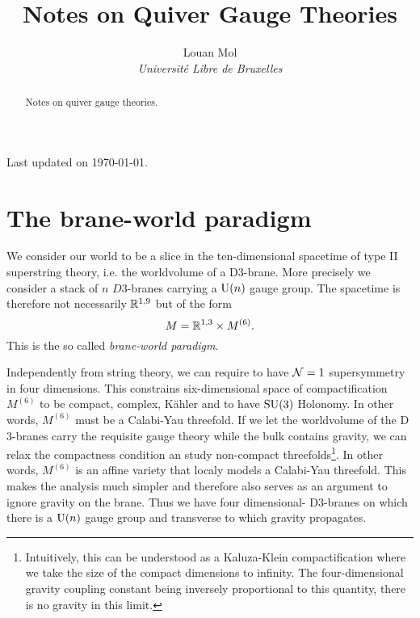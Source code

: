 \documentclass[a4paper,11pt]{article}
\title{\textbf{Notes on Quiver Gauge Theories}}
\author{Louan Mol\\ \textit{Université Libre de Bruxelles}}
\date{}
\begin{document}
\begin{titlepage}
    
    \maketitle

    \thispagestyle{empty}

    \vspace{2cm}

    \begin{abstract}
        Notes on quiver gauge theories.
    \end{abstract}

    \vfill

    \hfill Last updated on \today.
    
\end{titlepage}
  
\pagebreak

\tableofcontents

\pagebreak

\nocite{*}

\section{The brane-world paradigm}

    We consider our world to be a slice in the ten-dimensional spacetime of type II superstring theory, i.e. the worldvolume of a D$3$-brane. More precisely we consider a stack of $n$ $D$3-branes carrying a $\text{U}(n)$ gauge group. The spacetime is therefore not necessarily $\mathbb{R}^{1,9}$ but of the form
    \begin{equation*}
        M = \mathbb{R}^{1,3}\times M^{(6)}.
    \end{equation*}
    This is the so called \emph{brane-world paradigm}. 
    
    Independently from string theory, we can require to have $\mathcal{N}=1$ supersymmetry in four dimensions. This constrains six-dimensional space of compactification $M^{(6)}$ to be compact, complex, Kähler and to have $\text{SU}(3)$ Holonomy. In other words, $M^{(6)}$ must be a Calabi-Yau threefold. If we let the worldvolume of the D$3$-branes carry the requisite gauge theory while the bulk contains gravity, we can relax the compactness condition an study non-compact threefolds\footnote{Intuitively, this can be understood as a Kaluza-Klein compactification where we take the size of the compact dimensions to infinity. The four-dimensional gravity coupling constant being inversely proportional to this quantity, there is no gravity in this limit.}. In other words, $M^{(6)}$ is an affine variety that localy models a Calabi-Yau threefold. This makes the analysis much simpler and therefore also serves as an argument to ignore gravity on the brane. Thus we have four dimensional- D$3$-branes on which there is a $\text{U}(n)$ gauge group and transverse to which gravity propagates.
\end{document}
